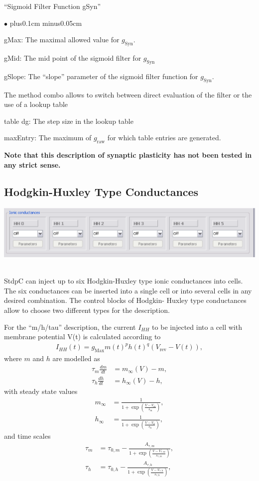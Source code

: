 \documentclass{article}
\newenvironment{myitem}{\begin{list}{$\bullet$}{\setlength{\leftmargin}{1.1em}
\itemsep0.1cm plus0.1cm minus0.05cm
\listparindent0cm
\addtolength{\labelsep}{0.5\labelsep}
\setlength{\labelwidth}{0.8em}
\setlength{\leftmargin}{\labelwidth}
\addtolength{\leftmargin}{\labelsep}
}}{\end{list}}
\begin{document}
``Sigmoid Filter Function gSyn''
\begin{myitem}
\item gMax: The maximal allowed value for $g_{\text{Syn}}$.
\item gMid: The mid point of the sigmoid filter for $g_{\text{Syn}}$
\item gSlope: The ``slope'' parameter of the sigmoid filter function
  for $g_{\text{Syn}}$.
\item The method combo allows to switch between direct evaluation of
  the filter or the use of a lookup table
\item table dg: The step size in the lookup table
\item maxEntry: The maximum of $g_{\text{raw}}$ for which table
  entries are generated.
\end{myitem}  
{\bf Note that this description of synaptic plasticity has not been
  tested in any strict sense.}

\subsection{Hodgkin-Huxley Type Conductances}

\parbox{\textwidth}{
  \includegraphics[scale=0.5]{HHBlock}
} \\[0.2cm]
 
StdpC can inject up to six Hodgkin-Huxley type ionic conductances into
cells. The six conductances can be inserted into a single cell
or into several cells in any desired combination. The control blocks
of Hodgkin- Huxley type conductances allow to choose two different
types for the description.

For the ``m/h/tau'' description, the current $I_{HH}$ to be injected
into a cell with membrane potential V(t) is calculated according to
\begin{align}
  I_{HH}(t) = g_{\text{Max}} m(t)^p h(t)^q (V_{\text{rev}}-V(t)),
\end{align}
where $m$ and $h$ are modelled as
\begin{align}
  \tau_m \frac{dm}{dt} &= m_\infty(V)-m , \\
  \tau_h \frac{dh}{dt} &= h_\infty(V)- h, 
\end{align}
with steady state values
\begin{align}
  m_\infty &= \frac{1}{1+\exp \left(\frac{V - V_m}{s_m}
  \right)}, \\
  h_\infty &= \frac{1}{1+\exp \left(\frac{V - V_h}{s_h}
  \right)}, 
\end{align}
and time scales 
\begin{align}
  \tau_m &= \tau_{0,m} - 
  \frac{A_{\tau,m}}{1+\exp\left(\frac{V-V_{\tau,m}}{s_{\tau,m}}\right)}, \\
  \tau_h &= \tau_{0,h} - 
  \frac{A_{\tau,h}}{1+\exp\left(\frac{V-V_{\tau,h}}{s_{\tau,h}}\right)}, 
\end{align}
  
\end{document}
